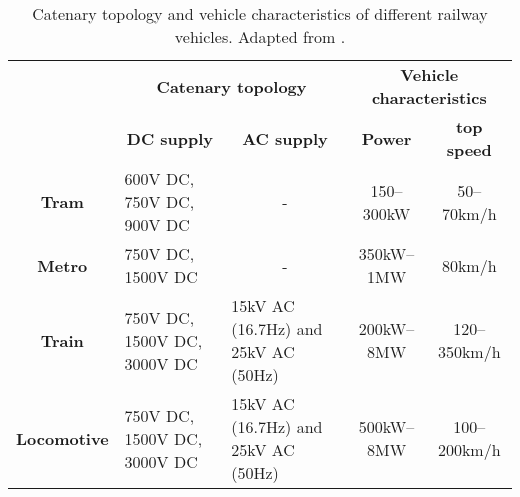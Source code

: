 \begin{table}[htbp]
	\centering
	\caption{Catenary topology and vehicle characteristics of different railway vehicles.  Adapted from \cite{abad2016}.}
	\begin{tabular}{|c|p{10.145em}p{10.355em}|cc|}
		\cmidrule{2-5}    \multicolumn{1}{c|}{} & \multicolumn{2}{c|}{\textbf{Catenary topology}} & \multicolumn{2}{c|}{\textbf{Vehicle characteristics}} \\
		\cmidrule{2-5}    \multicolumn{1}{c|}{} & \multicolumn{1}{c}{\textbf{DC supply}} & \multicolumn{1}{c|}{\textbf{AC supply}} & \textbf{Power} & \textbf{top speed} \\
		\midrule
		\textbf{Tram} & 600V DC, 750V DC, 900V DC & \multicolumn{1}{c}{-}     & 150–300kW & 50–70km/h \\
		\midrule
		\textbf{Metro} & 750V DC, 1500V DC & \multicolumn{1}{c}{-}     & 350kW–1MW & 80km/h \\
		\midrule
		\textbf{Train} & 750V DC, 1500V DC, 3000V DC & 15kV AC (16.7Hz) and 25kV AC (50Hz) & 200kW–8MW & 120–350km/h \\
		\midrule
		\textbf{Locomotive} & 750V DC, 1500V DC, 3000V DC & 15kV AC (16.7Hz) and 25kV AC (50Hz) & 500kW–8MW & 100–200km/h \\
		\bottomrule
	\end{tabular}%
	\label{tab:31.t1}%
\end{table}%
